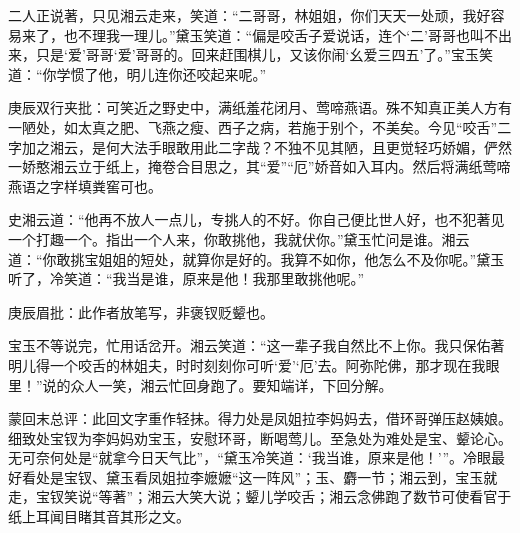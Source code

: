 \begin{parag}


    二人正说著，只见湘云走来，笑道：“二哥哥，林姐姐，你们天天一处顽，我好容易来了，也不理我一理儿。”黛玉笑道：“偏是咬舌子爱说话，连个‘二’哥哥也叫不出来，只是‘爱’哥哥‘爱’哥哥的。回来赶围棋儿，又该你闹‘幺爱三四五’了。”宝玉笑道：“你学惯了他，明儿连你还咬起来呢。”\begin{note}庚辰双行夹批：可笑近之野史中，满纸羞花闭月、莺啼燕语。殊不知真正美人方有一陋处，如太真之肥、飞燕之瘦、西子之病，若施于别个，不美矣。今见“咬舌”二字加之湘云，是何大法手眼敢用此二字哉？不独不见其陋，且更觉轻巧娇媚，俨然一娇憨湘云立于纸上，掩卷合目思之，其“爱”“厄”娇音如入耳内。然后将满纸莺啼燕语之字样填粪窖可也。\end{note}史湘云道：“他再不放人一点儿，专挑人的不好。你自己便比世人好，也不犯著见一个打趣一个。指出一个人来，你敢挑他，我就伏你。”黛玉忙问是谁。湘云道：“你敢挑宝姐姐的短处，就算你是好的。我算不如你，他怎么不及你呢。”黛玉听了，冷笑道：“我当是谁，原来是他！我那里敢挑他呢。”\begin{note}庚辰眉批：此作者放笔写，非褒钗贬颦也。\end{note}宝玉不等说完，忙用话岔开。湘云笑道：“这一辈子我自然比不上你。我只保佑著明儿得一个咬舌的林姐夫，时时刻刻你可听‘爱’‘厄’去。阿弥陀佛，那才现在我眼里！”说的众人一笑，湘云忙回身跑了。要知端详，下回分解。
\end{parag}

\begin{parag}

    \begin{note}蒙回末总评：此回文字重作轻抹。得力处是凤姐拉李妈妈去，借环哥弹压赵姨娘。细致处宝钗为李妈妈劝宝玉，安慰环哥，断喝莺儿。至急处为难处是宝、颦论心。无可奈何处是“就拿今日天气比”，“黛玉冷笑道：‘我当谁，原来是他！’”。冷眼最好看处是宝钗、黛玉看凤姐拉李嬷嬷“这一阵风”；玉、麝一节；湘云到，宝玉就走，宝钗笑说“等著”；湘云大笑大说；颦儿学咬舌；湘云念佛跑了数节可使看官于纸上耳闻目睹其音其形之文。\end{note}
\end{parag}